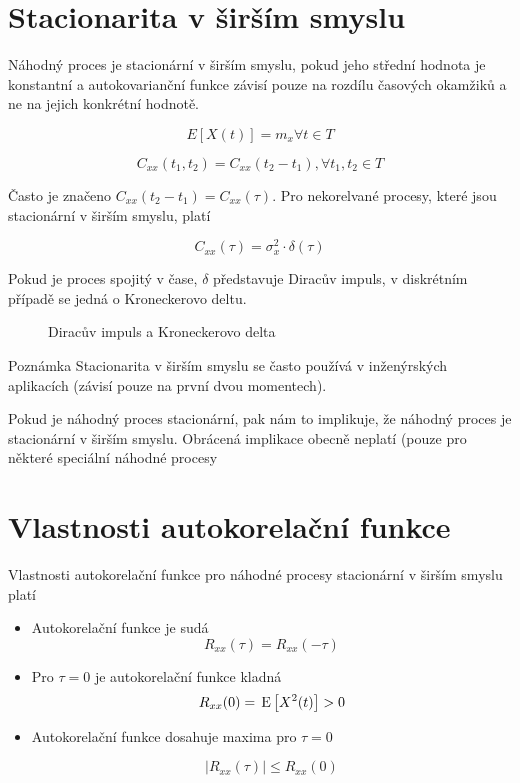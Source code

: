 \section{Stacionarita v širším smyslu}
Náhodný proces je stacionární v širším smyslu, pokud jeho střední hodnota je konstantní a autokovarianční funkce závisí pouze na rozdílu časových okamžiků a ne na jejich konkrétní hodnotě.

\[ E[X(t)] = m_x\forall t\in T \]

\[ C_{xx}(t_1,t_2)=C_{xx}(t_2-t_1),\forall t_1,t_2\in T \]

Často je značeno $C_{xx}(t_2-t_1)=C_{xx}(\tau)$. Pro nekorelvané procesy, které jsou stacionární v širším smyslu, platí

\[ C_{xx}(\tau) = \sigma_x^2\cdot\delta(\tau) \]

Pokud je proces spojitý v čase, $\delta$ představuje Diracův impuls, v diskrétním případě se jedná o Kroneckerovo deltu.

\begin{figure}
\caption{Diracův impuls a Kroneckerovo delta}
\end{figure}

\begin{note}{Poznámka}
Stacionarita v širším smyslu se často používá v inženýrských aplikacích (závisí pouze na první dvou momentech).
\end{note}

Pokud je náhodný proces stacionární, pak nám to implikuje, že náhodný proces je stacionární v širším smyslu. Obrácená implikace obecně neplatí (pouze pro některé speciální náhodné procesy

\section{Vlastnosti autokorelační funkce}
Vlastnosti autokorelační funkce pro náhodné procesy stacionární v širším smyslu platí

\begin{itemize}
\item Autokorelační funkce je sudá
\[ R_{xx}(\tau)=R_{xx}(-\tau) \]

\item Pro $\tau=0$ je autokorelační funkce kladná
\[ R_{xx}(0) = \,\mathrm{E}\left[X^2(t)\right]>0 \]

\item Autokorelační funkce dosahuje maxima pro $\tau=0$

\[ |R_{xx}(\tau)|\leq R_{xx}(0) \]
\end{itemize}


